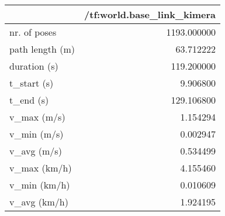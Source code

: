 \begin{tabular}{lr}
\toprule
{} &  /tf:world.base\_link\_kimera \\
\midrule
nr. of poses    &                 1193.000000 \\
path length (m) &                   63.712222 \\
duration (s)    &                  119.200000 \\
t\_start (s)     &                    9.906800 \\
t\_end (s)       &                  129.106800 \\
v\_max (m/s)     &                    1.154294 \\
v\_min (m/s)     &                    0.002947 \\
v\_avg (m/s)     &                    0.534499 \\
v\_max (km/h)    &                    4.155460 \\
v\_min (km/h)    &                    0.010609 \\
v\_avg (km/h)    &                    1.924195 \\
\bottomrule
\end{tabular}
